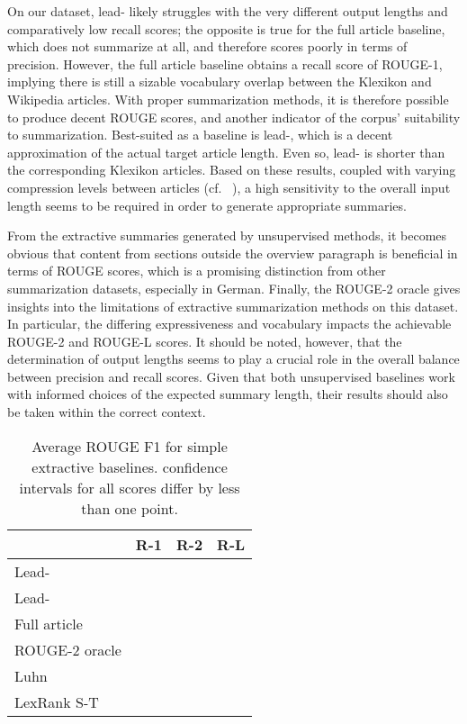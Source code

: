 \documentclass[10pt, a4paper]{article}
\begin{document}
On our dataset, lead- likely struggles with the very different output lengths and comparatively low recall scores; the opposite is true for the full article baseline, which does not summarize at all, and therefore scores poorly in terms of precision.
However, the full article baseline obtains a recall score of  ROUGE-1, implying there is still a sizable vocabulary overlap between the Klexikon and Wikipedia articles.
With proper summarization methods, it is therefore possible to produce decent ROUGE scores, and another indicator of the corpus' suitability to summarization.
Best-suited as a baseline is lead-, which is a decent approximation of the actual target article length. Even so, lead- is shorter than the corresponding Klexikon articles.
Based on these results, coupled with varying compression levels  between articles (cf. ~), a high sensitivity to the overall input length seems to be required in order to generate appropriate summaries.

From the extractive summaries generated by unsupervised methods, it becomes obvious that content from sections outside the overview paragraph is beneficial in terms of ROUGE scores, which is a promising distinction from other summarization datasets, especially in German.
Finally, the ROUGE-2 oracle gives insights into the limitations of extractive summarization methods on this dataset. In particular, the differing expressiveness and vocabulary impacts the achievable ROUGE-2 and ROUGE-L scores. It should be noted, however, that the determination of output lengths seems to play a crucial role in the overall balance between precision and recall scores. Given that both unsupervised baselines work with informed choices of the expected summary length, their results should also be taken within the correct context.

\begin{table}
	\centering
	\begin{tabular}{lr|r|r}
		\hline
		\textbf{} & \textbf{R-1} & \textbf{R-2} & \textbf{R-L}\\
		\hline
		Lead- &  &  &  \\
		Lead- &  &  &  \\
		Full article &  &  &  \\
		\hline
		ROUGE-2 oracle &  &  &  \\
		\hline
		Luhn &  &  &  \\
		LexRank S-T &  &  &  \\
		
	\end{tabular}
	\caption{Average ROUGE F1 for simple extractive baselines.  confidence intervals for all scores differ by less than one point.}
	\label{tab:rouge}
\end{table}
\end{document}
